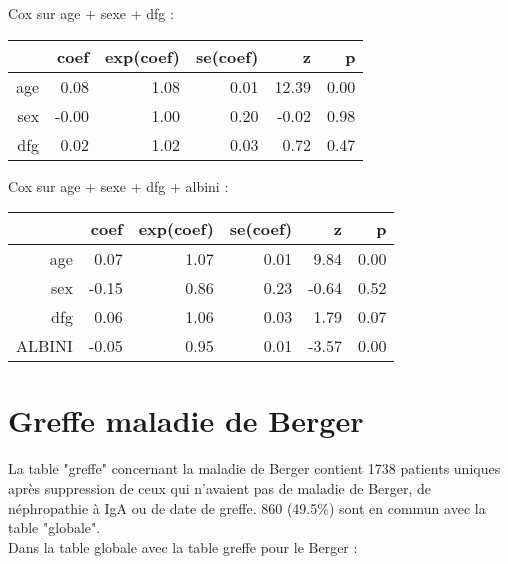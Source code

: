 \documentclass[11pt,a4paper]{article}\usepackage[]{graphicx}\usepackage[]{color}
\begin{document}
Cox sur age + sexe + dfg :
\begin{table}[H]
\centering
\begin{tabular}{rrrrrr}
  \hline
 & coef & exp(coef) & se(coef) & z & p \\ 
  \hline
age & 0.08 & 1.08 & 0.01 & 12.39 & 0.00 \\ 
  sex & -0.00 & 1.00 & 0.20 & -0.02 & 0.98 \\ 
  dfg & 0.02 & 1.02 & 0.03 & 0.72 & 0.47 \\ 
   \hline
\end{tabular}
\end{table}


Cox sur age + sexe + dfg + albini :
\begin{table}[H]
\centering
\begin{tabular}{rrrrrr}
  \hline
 & coef & exp(coef) & se(coef) & z & p \\ 
  \hline
age & 0.07 & 1.07 & 0.01 & 9.84 & 0.00 \\ 
  sex & -0.15 & 0.86 & 0.23 & -0.64 & 0.52 \\ 
  dfg & 0.06 & 1.06 & 0.03 & 1.79 & 0.07 \\ 
  ALBINI & -0.05 & 0.95 & 0.01 & -3.57 & 0.00 \\ 
   \hline
\end{tabular}
\end{table}


  
\section{Greffe maladie de Berger}




La table "greffe" concernant la maladie de Berger contient 1738 patients uniques après suppression de ceux qui n'avaient pas de maladie de Berger, de néphropathie à IgA ou de date de greffe. 860 (49.5\%) sont en commun avec la table "globale".
~\\

Dans la table globale avec la table greffe pour le Berger :
\end{document}
